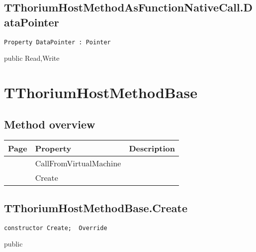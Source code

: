 \subsection{TThoriumHostMethodAsFunctionNativeCall.DataPointer}
\label{thoriumcore:thorium:tthoriumhostmethodasfunctionnativecall:datapointer}
\begin{FPCList}
\Synopsis
\Declaration 

\begin{verbatim}
Property DataPointer : Pointer
\end{verbatim}
\Visibility
public
\Access
Read,Write
\Description
\end{FPCList}
\section{TThoriumHostMethodBase}
\label{thoriumcore:thorium:tthoriumhostmethodbase}
\subsection{Method overview}
\label{thoriumcore:thorium:tthoriumhostmethodbase:methods}
\begin{tabularx}{\textwidth}{llX}
Page & Property & Description  \\ \hline
\pageref{thoriumcore:thorium:tthoriumhostmethodbase:callfromvirtualmachine} & CallFromVirtualMachine  &  \\
\pageref{thoriumcore:thorium:tthoriumhostmethodbase:create} & Create  &  \\
\hline
\end{tabularx}
\subsection{TThoriumHostMethodBase.Create}
\label{thoriumcore:thorium:tthoriumhostmethodbase:create}
\begin{FPCList}
\Synopsis
\Declaration 

\begin{verbatim}
constructor Create;  Override
\end{verbatim}
\Visibility
public
\Description
\Errors
\end{FPCList}
